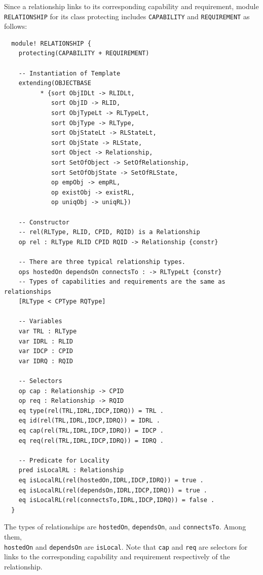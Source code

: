 \documentclass[12pt]{report}
\begin{document}
Since a relationship links to its corresponding capability and
requirement, module {\tt RELATIONSHIP} for its class protecting
includes {\tt CAPABILITY} and {\tt REQUIREMENT} as follows:
\small
\begin{verbatim}
  module! RELATIONSHIP {
    protecting(CAPABILITY + REQUIREMENT)
  
    -- Instantiation of Template
    extending(OBJECTBASE
          * {sort ObjIDLt -> RLIDLt,
             sort ObjID -> RLID,
             sort ObjTypeLt -> RLTypeLt,
             sort ObjType -> RLType,
             sort ObjStateLt -> RLStateLt,
             sort ObjState -> RLState,
             sort Object -> Relationship,
             sort SetOfObject -> SetOfRelationship,
             sort SetOfObjState -> SetOfRLState,
             op empObj -> empRL,
             op existObj -> existRL,
             op uniqObj -> uniqRL})
  
    -- Constructor
    -- rel(RLType, RLID, CPID, RQID) is a Relationship
    op rel : RLType RLID CPID RQID -> Relationship {constr}
  
    -- There are three typical relationship types.
    ops hostedOn dependsOn connectsTo : -> RLTypeLt {constr}
    -- Types of capabilities and requirements are the same as relationships
    [RLType < CPType RQType]
  
    -- Variables
    var TRL : RLType
    var IDRL : RLID
    var IDCP : CPID
    var IDRQ : RQID
  
    -- Selectors
    op cap : Relationship -> CPID
    op req : Relationship -> RQID
    eq type(rel(TRL,IDRL,IDCP,IDRQ)) = TRL .
    eq id(rel(TRL,IDRL,IDCP,IDRQ)) = IDRL .
    eq cap(rel(TRL,IDRL,IDCP,IDRQ)) = IDCP .
    eq req(rel(TRL,IDRL,IDCP,IDRQ)) = IDRQ .
  
    -- Predicate for Locality
    pred isLocalRL : Relationship
    eq isLocalRL(rel(hostedOn,IDRL,IDCP,IDRQ)) = true .
    eq isLocalRL(rel(dependsOn,IDRL,IDCP,IDRQ)) = true .
    eq isLocalRL(rel(connectsTo,IDRL,IDCP,IDRQ)) = false .
  }
\end{verbatim}
\normalsize
The types of relationships are {\tt hostedOn}, {\tt dependsOn}, and
{\tt connectsTo}.  Among them,\\ {\tt hostedOn} and {\tt dependsOn} are
{\tt isLocal}.  Note that {\tt cap} and {\tt req} are selectors for
links to the corresponding capability and requirement respectively of
the relationship.
\end{document}
